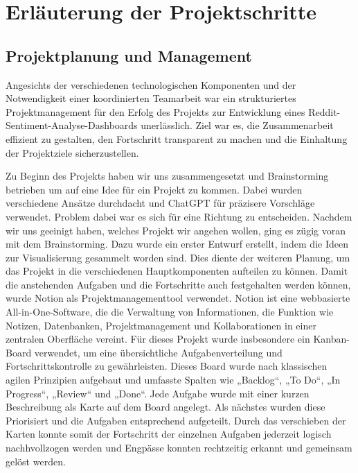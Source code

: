 \section{Erläuterung der Projektschritte}
\subsection{Projektplanung und Management}

Angesichts der verschiedenen technologischen Komponenten und der Notwendigkeit einer koordinierten Teamarbeit war ein strukturiertes Projektmanagement für den Erfolg des Projekts zur Entwicklung eines Reddit-Sentiment-Analyse-Dashboards unerlässlich. Ziel war es, die Zusammenarbeit effizient zu gestalten, den Fortschritt transparent zu machen und die Einhaltung der Projektziele sicherzustellen. 

Zu Beginn des Projekts haben wir uns zusammengesetzt und Brainstorming betrieben um auf eine Idee für ein Projekt zu kommen. Dabei wurden verschiedene Ansätze durchdacht und ChatGPT für präzisere Vorschläge verwendet. Problem dabei war es sich für eine Richtung zu entscheiden. Nachdem wir uns geeinigt haben, welches Projekt wir angehen wollen, ging es zügig voran mit dem Brainstorming. Dazu wurde ein erster Entwurf erstellt, indem die Ideen zur Visualisierung gesammelt worden sind. Dies diente der weiteren Planung, um das Projekt in die verschiedenen Hauptkomponenten aufteilen zu können. Damit die anstehenden Aufgaben und die Fortschritte auch festgehalten werden können, wurde Notion als Projektmanagementtool verwendet. Notion ist eine webbasierte All-in-One-Software, die die Verwaltung von Informationen, die Funktion wie Notizen, Datenbanken, Projektmanagement und Kollaborationen in einer zentralen Oberfläche vereint. Für dieses Projekt wurde insbesondere ein Kanban-Board verwendet, um eine übersichtliche Aufgabenverteilung und Fortschrittskontrolle zu gewährleisten. Dieses Board wurde nach klassischen agilen Prinzipien aufgebaut und umfasste Spalten wie „Backlog“, „To Do“, „In Progress“, „Review“ und „Done“. Jede Aufgabe wurde mit einer kurzen Beschreibung als Karte auf dem Board angelegt. Als nächstes wurden diese Priorisiert und die Aufgaben entsprechend aufgeteilt. Durch das verschieben der Karten konnte somit der Fortschritt der einzelnen Aufgaben jederzeit logisch nachhvollzogen werden und Engpässe konnten rechtzeitig erkannt  und gemeinsam gelöst werden.

